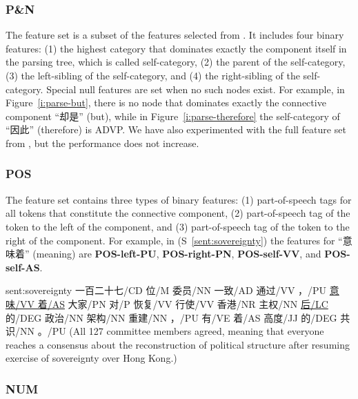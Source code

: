 \subsubsection{P\&N}

The feature set is a subset of the features selected from
\cite{pitler2009using}. It includes four binary features:
(1) the highest category that dominates exactly the component
itself in the parsing tree, which is called self-category, (2) the parent of the self-category,
(3) the left-sibling of the self-category, and (4) the right-sibling of the self-category.
Special null features are set when no such nodes exist. For example,
in Figure~\ref{i:parse-but}, there is no node that dominates exactly the
connective component ``却是'' (but), while in Figure~\ref{i:parse-therefore} the
self-category of ``因此'' (therefore) is ADVP. We have also experimented
with the full feature set from \cite{pitler2009using}, but the performance
does not increase.



\subsubsection{POS}

The feature set contains three types of binary features:
(1) part-of-speech tags for all tokens that constitute the connective component,
(2) part-of-speech tag of the token to the left of the component, and
(3) part-of-speech tag of the token to the right of the component. For example,
in (S~\ref{sent:sovereignty}) the features for ``意味着'' (meaning) are
\textbf{POS-left-PU}, \textbf{POS-right-PN}, \textbf{POS-self-VV}, and
\textbf{POS-self-AS}.

\begin{sent}{sent:sovereignty}{}
    一百二十七/CD 位/M 委员/NN 一致/AD 通过/VV ，/PU \underline{意味/VV 着/AS} 大家/PN 对/P
    恢复/VV 行使/VV 香港/NR 主权/NN \underline{后/LC} 的/DEG 政治/NN 架构/NN 重建/NN ，/PU
    有/VE 着/AS 高度/JJ 的/DEG 共识/NN 。/PU
    (All 127 committee members agreed, meaning that everyone reaches a consensus about
    the reconstruction of political structure after resuming exercise of sovereignty over Hong Kong.)
\end{sent}

\subsubsection{NUM}

